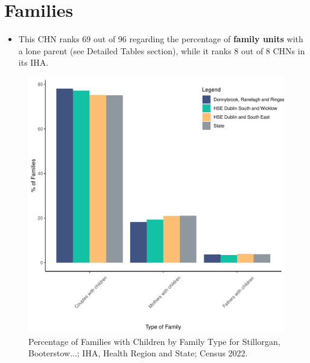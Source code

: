 \documentclass{article}
\begin{document}
\section{Families}\label{sect:Fam}
\begin{itemize}
\item This CHN ranks  69 out of 96 regarding the percentage of \textbf{family units} with a lone parent (see Detailed Tables section), while it ranks   8 out of 8 CHNs in its IHA.
\end{itemize}
\begin{figure}[H]
	\centering
	\includegraphics[width = 150mm]{../figures/FamED.pdf}
	\caption{Percentage of Families with Children by Family Type for Stillorgan, Booterstow...; IHA, Health Region and State; Census 2022.}
	\label{fig:vbnv}
	\end{figure}
	
\end{document}
